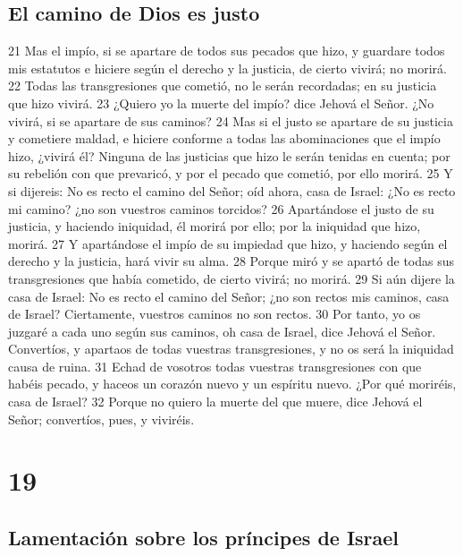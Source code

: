 \section*{El camino de Dios es justo}

21 Mas el impío, si se apartare de todos sus pecados que hizo, y guardare todos mis estatutos e hiciere según el derecho y la justicia, de cierto vivirá; no morirá.
22 Todas las transgresiones que cometió, no le serán recordadas; en su justicia que hizo vivirá.
23 ¿Quiero yo la muerte del impío? dice Jehová el Señor. ¿No vivirá, si se apartare de sus caminos?
24 Mas si el justo se apartare de su justicia y cometiere maldad, e hiciere conforme a todas las abominaciones que el impío hizo, ¿vivirá él? Ninguna de las justicias que hizo le serán tenidas en cuenta; por su rebelión con que prevaricó, y por el pecado que cometió, por ello morirá.
25 Y si dijereis: No es recto el camino del Señor; oíd ahora, casa de Israel: ¿No es recto mi camino? ¿no son vuestros caminos torcidos?
26 Apartándose el justo de su justicia, y haciendo iniquidad, él morirá por ello; por la iniquidad que hizo, morirá.
27 Y apartándose el impío de su impiedad que hizo, y haciendo según el derecho y la justicia, hará vivir su alma.
28 Porque miró y se apartó de todas sus transgresiones que había cometido, de cierto vivirá; no morirá.
29 Si aún dijere la casa de Israel: No es recto el camino del Señor; ¿no son rectos mis caminos, casa de Israel? Ciertamente, vuestros caminos no son rectos.
30 Por tanto, yo os juzgaré a cada uno según sus caminos, oh casa de Israel, dice Jehová el Señor. Convertíos, y apartaos de todas vuestras transgresiones, y no os será la iniquidad causa de ruina.
31 Echad de vosotros todas vuestras transgresiones con que habéis pecado, y haceos un corazón nuevo y un espíritu nuevo. ¿Por qué moriréis, casa de Israel?
32 Porque no quiero la muerte del que muere, dice Jehová el Señor; convertíos, pues, y viviréis.

\chapter{19}

\section*{Lamentación sobre los príncipes de Israel}

